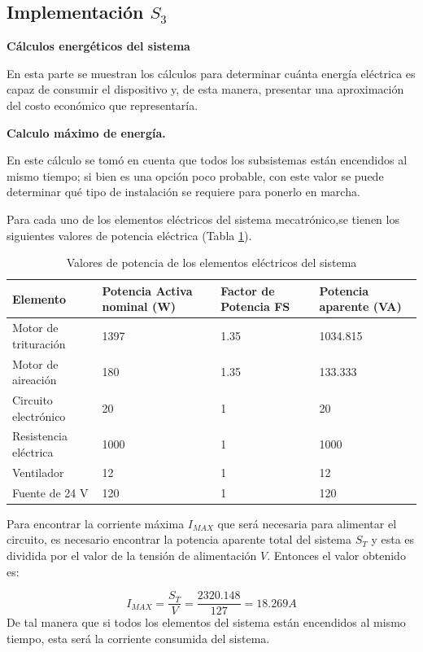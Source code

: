 \subsection{Implementación $S_3$}

\textbf{Cálculos energéticos del sistema}

En esta parte se muestran los cálculos para determinar cuánta energía eléctrica es capaz de consumir el dispositivo y, de esta manera, presentar una aproximación del costo económico que representaría.

\textbf{Calculo máximo de energía.}

En este cálculo se tomó en cuenta que todos los subsistemas están encendidos al mismo tiempo; si bien es una opción poco probable, con este valor se puede determinar qué tipo de instalación se requiere para ponerlo en marcha.

Para cada uno de los elementos eléctricos del sistema mecatrónico,se tienen los siguientes valores de potencia eléctrica (Tabla \ref{tab:Electrical_values}).


\begin{table}
    \centering
\caption{Valores de potencia de los elementos eléctricos del sistema}
\label{tab:Electrical_values}
    \begin{tabular}{|m{2.5cm}|m{2.5cm}|m{2.5cm} |m{2.5cm}|} \hline 
         Elemento&  Potencia Activa nominal (W)&Factor de Potencia FS &Potencia aparente (VA)\\ \hline 
         Motor de trituración&  1397&1.35 &1034.815\\ \hline 
         Motor de aireación&  180&1.35 &133.333\\ \hline 
         Circuito electrónico&  20&1 &20\\ \hline 
         Resistencia eléctrica&  1000&1 &1000 \\ \hline 
         Ventilador&  12&1 &12\\ \hline 
         Fuente de 24 V&  120&1 &120 \\\hline
    \end{tabular}
    
    
\end{table}

Para encontrar la corriente máxima $I_{MAX}$ que será necesaria para alimentar el circuito, es necesario encontrar la potencia aparente total del sistema $S_T$  y esta es dividida por el valor de la tensión de alimentación $V$. Entonces el valor obtenido es:

\begin{equation*}
    I_{MAX} = \frac{S_T}{V} = \frac{2320.148}{127} = 18.269 A
\end{equation*}
De tal manera que si todos los elementos del sistema están encendidos al mismo tiempo, esta será la corriente consumida del sistema.

